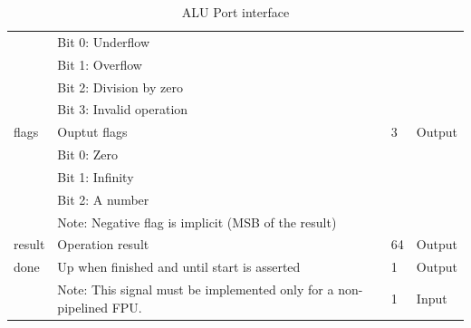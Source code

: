 \begin{table}
\begin{center}
\begin{tabu}{|X[l]|X[3,l]|X[c]|X[c]|}
                   & Bit 0: Underflow                             &    &         \\
                   & Bit 1: Overflow                              &    &         \\
                   & Bit 2: Division by zero                      &    &         \\
                   & Bit 3: Invalid operation                     &    &         \\
\hline
flags              & Ouptut flags                                 & 3  & Output  \\
                   & Bit 0: Zero                                  &    &         \\
                   & Bit 1: Infinity                              &    &         \\
                   & Bit 2: A number                              &    &         \\
                   & Note: Negative flag is implicit (MSB of the result) &    &         \\
\hline
result             & Operation result                             & 64 & Output  \\
\hline
done               & Up when finished and until start is asserted & 1  & Output  \\
                   & Note: This signal must be implemented only for a non-pipelined FPU. & 1  & Input   \\
\hline
\end{tabu}
\end{center}
\caption{ALU Port interface}
\label{tbl:fpu_interface}
\end{table}


